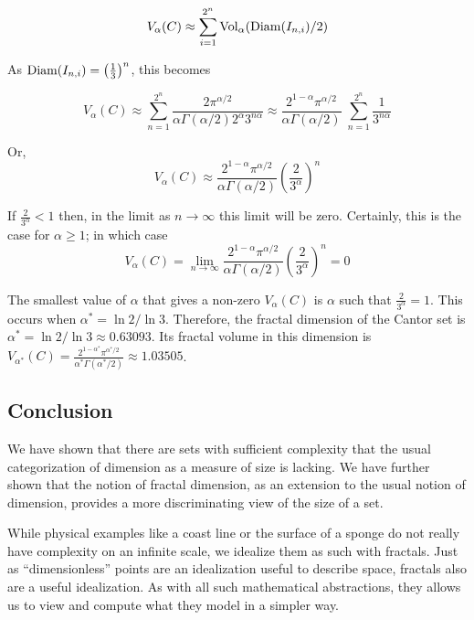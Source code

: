 $$
V_\alpha(C) \approx \sum_{i=1}^{2^n} {\rm Vol}_\alpha({\rm
  Diam}(I_{n,i}) / 2)
$$

As ${\rm Diam}(I_{n,i}) = \left(\frac{1}{3}\right)^n$, this becomes


$$
V_\alpha(C) \approx \sum_{n=1}^{2^n} \frac{2
  \pi^{\alpha/2}}{ \alpha \Gamma(\alpha/2) 2^\alpha 3^{n\alpha}} 
  \approx  \frac{
  2^{1 - \alpha} \pi^{\alpha/2}}{\alpha \Gamma(\alpha/2)} \;
  \sum_{n=1}^{2^n}  
\frac{1}{3^{n\alpha}}
$$

Or, 
$$
V_\alpha(C) \approx \frac{ 2^{1-\alpha} \pi^{\alpha/2}}{\alpha
  \Gamma(\alpha/2)} (\frac{2}{3^\alpha})^n
$$


If $\frac{2}{3^\alpha} < 1$ then, in the limit as 
$n \rightarrow \infty$ 
this limit will be zero. Certainly,
this is the case for $\alpha \ge 1$; in which case 
$$
V_\alpha(C) =  \lim_{n \rightarrow \infty}  \frac{ 2^{1-\alpha} 
\pi^{\alpha/2}}{\alpha
  \Gamma(\alpha/2)} (\frac{2}{3^\alpha})^n = 0 
$$

The smallest value of $\alpha$ that gives a non-zero $V_\alpha(C)$ 
is $\alpha$ such that $\frac{2}{3^\alpha} = 1$. 
This occurs when
$\alpha^* = \ln 2 / \ln 3$. Therefore, the fractal dimension of the
Cantor set is $\alpha^* = \ln 2 / \ln 3 \approx 0.63093$. 
Its fractal volume in this
dimension is $V_{\alpha^*}(C) =  \frac{2^{1-\alpha^*} 
\pi^{\alpha^*/2}}{\alpha^*
\Gamma(\alpha^* / 2)} \approx 1.03505 $.

\subsection{Conclusion}
We have shown that there are sets with sufficient complexity that the
usual categorization of dimension as a measure of size is lacking. 
We have further shown
that the notion of fractal dimension, as an extension to the usual
notion of dimension, provides a more discriminating view of the size
of a set.

While physical examples like a coast line or the surface of a sponge do 
not really have
complexity on an infinite scale, we idealize them as such with
fractals. Just as ``dimensionless'' points are an idealization useful
to describe space, fractals also are a useful idealization. 
As with all such mathematical abstractions, they 
allows us to view and compute what they model in a simpler way.

\bye
